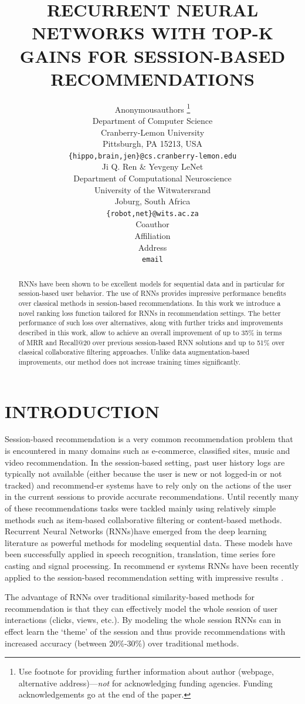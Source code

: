 \documentclass{article} %
\title{RECURRENT NEURAL NETWORKS WITH TOP-K GAINS  FOR SESSION-BASED RECOMMENDATIONS
}
\author{Anonymousauthors \thanks{ Use footnote for providing further information
about author (webpage, alternative address)---\emph{not} for acknowledging
funding agencies.  Funding acknowledgements go at the end of the paper.} \\
Department of Computer Science\\
Cranberry-Lemon University\\
Pittsburgh, PA 15213, USA \\
\texttt{\{hippo,brain,jen\}@cs.cranberry-lemon.edu} \\
\And
Ji Q. Ren \& Yevgeny LeNet \\
Department of Computational Neuroscience \\
University of the Witwatersrand \\
Joburg, South Africa \\
\texttt{\{robot,net\}@wits.ac.za} \\
\AND
Coauthor \\
Affiliation \\
Address \\
\texttt{email}
}
\begin{document}
\maketitle

\begin{abstract}

RNNs have been shown to be excellent models for sequential data and in particular for session-based user behavior. The use of RNNs provides impressive performance beneﬁts over classical methods in session-based recommendations. In this work we introduce a novel ranking loss function tailored for RNNs in recommendation settings. The better performance of such loss over alternatives, along with further tricks and improvements described in this work, allow to achieve an overall improvement of up to 35\% in terms of MRR and Recall@20 over previous session-based RNN solutions and up to 51\% over classical collaborative ﬁltering approaches. Unlike data augmentation-based improvements, our method does not increase training times signiﬁcantly.
\end{abstract}

\section{INTRODUCTION}

Session-based recommendation is a very common recommendation problem that is encountered in many domains such as e-commerce, classiﬁed sites, music and video recommendation. In the session-based setting, past user history logs are typically not available (either because the user is new or not logged-in or not tracked) and recommend-er systems have to rely only on the actions of the user in the current sessions to provide accurate recommendations. Until recently many of these recommendations tasks were tackled mainly using relatively simple methods such as item-based collaborative ﬁltering \cite{sarwar2001item} or content-based methods. Recurrent Neural Networks (RNNs)have emerged from the deep learning literature as powerful methods for modeling sequential data. These models have been successfully applied in speech recognition, translation, time series fore casting and signal processing. In recommend er systems RNNs have been recently applied to the session-based recommendation setting with impressive results \cite{hidasi2012fast}. 


The advantage of RNNs over traditional similarity-based methods for recommendation is that they can effectively model the whole session of user interactions (clicks, views, etc.). By modeling the whole session RNNs can in effect learn the ‘theme’ of the session and thus provide recommendations with increased accuracy (between 20\%-30\%) over traditional methods.
\end{document}
